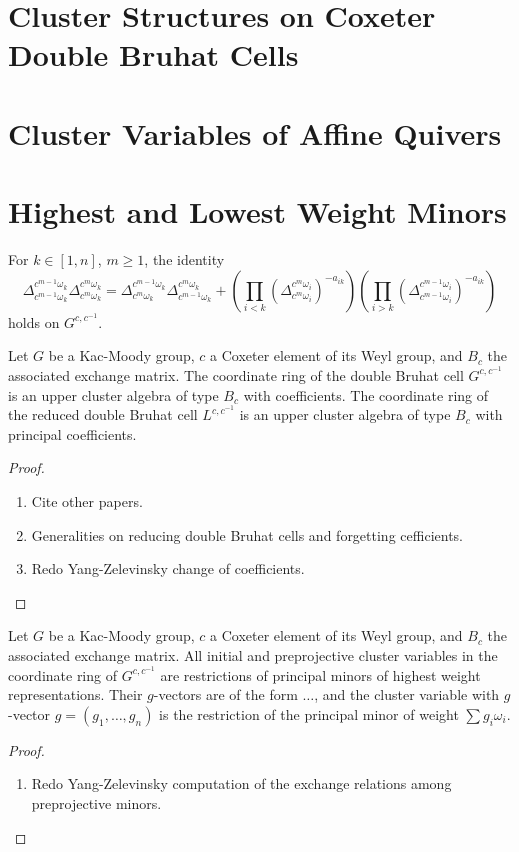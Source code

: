 \documentclass[11pt]{amsart}
\begin{document}
\section{Cluster Structures on Coxeter Double Bruhat Cells}
\section{Cluster Variables of Affine Quivers}

\section{Highest and Lowest Weight Minors}

\begin{lemma}
For $k \in [1,n]$, $m \geq 1$, the identity
\begin{equation}
\Delta_{c^{m-1}\omega_k}^{c^{m-1}\omega_k}\Delta_{c^{m}\omega_k}^{c^{m}\omega_k} = \Delta_{c^{m}\omega_k}^{c^{m-1}\omega_k}\Delta_{c^{m-1}\omega_k}^{c^{m}\omega_k} + \left(\prod_{i < k}(\Delta_{c^{m}\omega_i}^{c^{m}\omega_i})^{-a_{ik}}\right)\left(\prod_{i>k}(\Delta_{c^{m-1}\omega_i}^{c^{m-1}\omega_i})^{-a_{ik}}\right)
\end{equation}
holds on $G^{c,c^{-1}}$.
\end{lemma}

\begin{proposition}
Let $G$ be a Kac-Moody group, $c$ a Coxeter element of its Weyl group, and $B_c$ the associated exchange matrix.  The coordinate ring of the double Bruhat cell $G^{c,c^{-1}}$ is an upper cluster algebra of type $B_c$ with coefficients.  The coordinate ring of the reduced double Bruhat cell $L^{c,c^{-1}}$ is an upper cluster algebra of type $B_c$ with principal coefficients.
\end{proposition}
\begin{proof}
\begin{enumerate}
\item Cite other papers.
\item Generalities on reducing double Bruhat cells and forgetting cefficients.
\item Redo Yang-Zelevinsky change of coefficients.
\end{enumerate}
\end{proof}

\begin{proposition}
Let $G$ be a Kac-Moody group, $c$ a Coxeter element of its Weyl group, and $B_c$ the associated exchange matrix.  All initial and preprojective cluster variables in the coordinate ring of $G^{c,c^{-1}}$ are restrictions of principal minors of highest weight representations.  Their $g$-vectors are of the form $\dotsc$, and the cluster variable with $g$-vector $g = (g_1,\dotsc,g_n)$ is the restriction of the principal minor of weight $\sum g_i \omega_i$.
\end{proposition}
\begin{proof}
\begin{enumerate}
\item Redo Yang-Zelevinsky computation of the exchange relations among preprojective minors.
\end{enumerate}
\end{proof}
\end{document}
